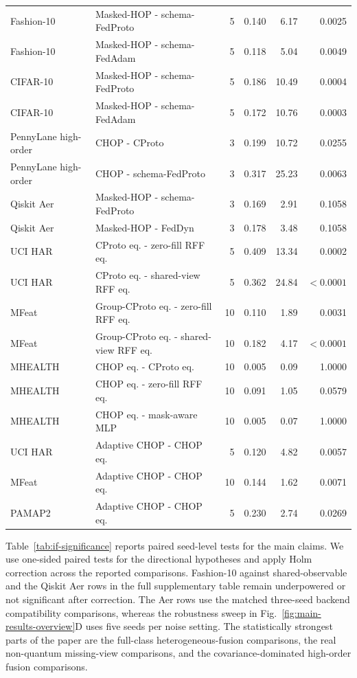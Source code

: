 \documentclass[preprint]{elsarticle}
\begin{document}
\begin{table}[t]
{\begin{tabular}{llrrrr}
Fashion-10 & Masked-HOP - schema-FedProto & 5 & 0.140 & 6.17 & 0.0025 \\
Fashion-10 & Masked-HOP - schema-FedAdam & 5 & 0.118 & 5.04 & 0.0049 \\
CIFAR-10 & Masked-HOP - schema-FedProto & 5 & 0.186 & 10.49 & 0.0004 \\
CIFAR-10 & Masked-HOP - schema-FedAdam & 5 & 0.172 & 10.76 & 0.0003 \\
PennyLane high-order & CHOP - CProto & 3 & 0.199 & 10.72 & 0.0255 \\
PennyLane high-order & CHOP - schema-FedProto & 3 & 0.317 & 25.23 & 0.0063 \\
Qiskit Aer & Masked-HOP - schema-FedProto & 3 & 0.169 & 2.91 & 0.1058 \\
Qiskit Aer & Masked-HOP - FedDyn & 3 & 0.178 & 3.48 & 0.1058 \\
UCI HAR & CProto eq. - zero-fill RFF eq. & 5 & 0.409 & 13.34 & 0.0002 \\
UCI HAR & CProto eq. - shared-view RFF eq. & 5 & 0.362 & 24.84 & \(<0.0001\) \\
MFeat & Group-CProto eq. - zero-fill RFF eq. & 10 & 0.110 & 1.89 & 0.0031 \\
MFeat & Group-CProto eq. - shared-view RFF eq. & 10 & 0.182 & 4.17 & \(<0.0001\) \\
MHEALTH & CHOP eq. - CProto eq. & 10 & 0.005 & 0.09 & 1.0000 \\
MHEALTH & CHOP eq. - zero-fill RFF eq. & 10 & 0.091 & 1.05 & 0.0579 \\
MHEALTH & CHOP eq. - mask-aware MLP & 10 & 0.005 & 0.07 & 1.0000 \\
UCI HAR & Adaptive CHOP - CHOP eq. & 5 & 0.120 & 4.82 & 0.0057 \\
MFeat & Adaptive CHOP - CHOP eq. & 10 & 0.144 & 1.62 & 0.0071 \\
PAMAP2 & Adaptive CHOP - CHOP eq. & 5 & 0.230 & 2.74 & 0.0269 \\
\bottomrule
\end{tabular}%
}
\end{table}


Table~\ref{tab:if-significance} reports paired seed-level tests for the main claims. We use one-sided paired tests for the directional hypotheses and apply Holm correction across the reported comparisons. Fashion-10 against shared-observable and the Qiskit Aer rows in the full supplementary table remain underpowered or not significant after correction. The Aer rows use the matched three-seed backend compatibility comparisons, whereas the robustness sweep in Fig.~\ref{fig:main-results-overview}D uses five seeds per noise setting. The statistically strongest parts of the paper are the full-class heterogeneous-fusion comparisons, the real non-quantum missing-view comparisons, and the covariance-dominated high-order fusion comparisons.
\end{document}
